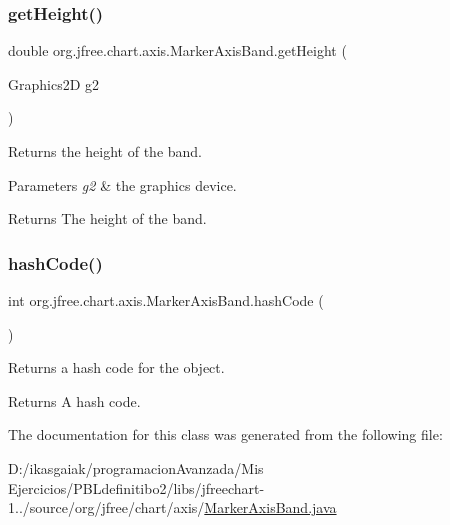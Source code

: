 \subsubsection{\texorpdfstring{get\+Height()}{getHeight()}}
{\footnotesize\ttfamily double org.\+jfree.\+chart.\+axis.\+Marker\+Axis\+Band.\+get\+Height (\begin{DoxyParamCaption}\item[{Graphics2D}]{g2 }\end{DoxyParamCaption})}

Returns the height of the band.


\begin{DoxyParams}{Parameters}
{\em g2} & the graphics device.\\
\hline
\end{DoxyParams}
\begin{DoxyReturn}{Returns}
The height of the band. 
\end{DoxyReturn}
\mbox{\label{classorg_1_1jfree_1_1chart_1_1axis_1_1_marker_axis_band_a476caf21452b906c946f5b9f0501e6fa}} 
\subsubsection{\texorpdfstring{hash\+Code()}{hashCode()}}
{\footnotesize\ttfamily int org.\+jfree.\+chart.\+axis.\+Marker\+Axis\+Band.\+hash\+Code (\begin{DoxyParamCaption}{ }\end{DoxyParamCaption})}

Returns a hash code for the object.

\begin{DoxyReturn}{Returns}
A hash code. 
\end{DoxyReturn}


The documentation for this class was generated from the following file\+:\begin{DoxyCompactItemize}
\item 
D\+:/ikasgaiak/programacion\+Avanzada/\+Mis Ejercicios/\+P\+B\+Ldefinitibo2/libs/jfreechart-\/1../source/org/jfree/chart/axis/\mbox{\hyperlink{_marker_axis_band_8java}{Marker\+Axis\+Band.\+java}}\end{DoxyCompactItemize}
